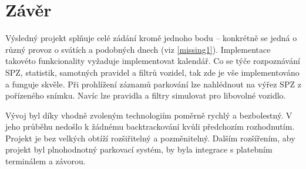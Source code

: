 \chapter*{Závěr}

Výsledný projekt splňuje celé zádání kromě jednoho bodu -- konkrétně se jedná o
různý provoz
o svátích a podobných dnech (viz \ref{missing1}). Implementace takovéto funkcionality
vyžaduje implementovat kalendář.
Co se týče rozpoznávání SPZ, statistik, samotných pravidel a filtrů vozidel,
tak zde je vše implementováno a funguje skvěle.
Při prohlížení záznamů parkování lze nahlédnout na výřez SPZ z pořízeného snímku.
Navíc lze pravidla a filtry simulovat pro libovolné vozidlo.

Vývoj byl díky vhodně zvoleným technologiím poměrně rychlý a bezbolestný.
V jeho průběhu nedošlo k žádnému backtrackování kvůli předchozím rozhodnutím.
Projekt je bez velkých obtíží rozšiřitelný a pozměnitelný.
Dalším rozšířením, aby projekt byl plnohodnotný parkovací systém, by byla
integrace s platebním terminálem a závorou.
